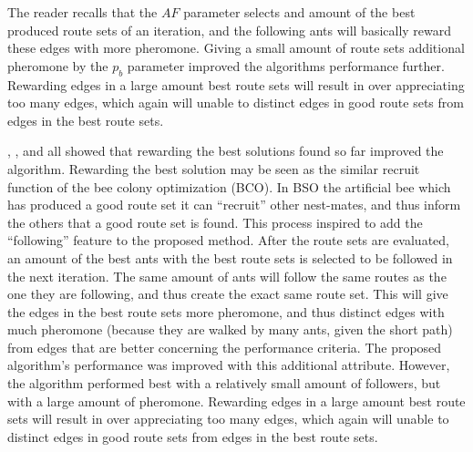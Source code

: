 The reader recalls that the $AF$ parameter selects and amount of the best produced route sets of an iteration, and the following ants will basically reward these edges with more pheromone. Giving a small amount of route sets additional pheromone by the $p_b$ parameter improved the algorithms performance further. Rewarding edges in a large amount best route sets will result in over appreciating too many edges, which again will unable to distinct edges in good route sets from edges in the best route sets. 

\citet{salehi-nezhad07}, \citet{tripathi09}, and \citet{sedighpour14} all showed that rewarding the best solutions found so far improved the algorithm. Rewarding the best solution may be seen as the similar recruit function of the bee colony optimization (BCO). In BSO the artificial bee which has produced a good route set it can ``recruit'' other nest-mates, and thus inform the others that a good route set is found. This process inspired to add the ``following'' feature to the proposed method. After the route sets are evaluated, an amount of the best ants with the best route sets is selected to be followed in the next iteration. The same amount of ants will follow the same routes as the one they are following, and thus create the exact same route set. This will give the edges in the best route sets more pheromone, and thus distinct edges with much pheromone (because they are walked by many ants, given the short path) from edges that are better concerning the performance criteria. The proposed algorithm's performance was improved with this additional attribute. However, the algorithm performed best with a relatively small amount of followers, but with a large amount of pheromone.  Rewarding edges in a large amount best route sets will result in over appreciating too many edges, which again will unable to distinct edges in good route sets from edges in the best route sets.  %

